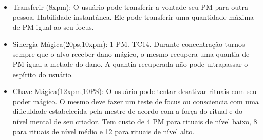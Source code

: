 \begin{itemize}
\item Transferir (8xpm): O usuário pode transferir a vontade seu PM para outra pessoa. Habilidade instantânea. Ele pode transferir uma quantidade máxima de PM igual ao seu focus.

	\item Sinergia Mágica(20ps,10xpm): 1 PM. TC14. \newline
Durante concentração turnos sempre que o alvo receber dano mágico, o mesmo recupera uma quantia de PM igual a metade do dano. A quantia recuperada não pode ultrapassar o espírito do usuário.

	\item  Chave Mágica(12xpm,10PS): O usuário pode tentar desativar rituais com seu poder mágico. O mesmo deve fazer um teste de focus ou consciencia com uma dificuldade estabelecida pela mestre de acordo com a força do ritual e do nível mental de seu criador. Tem custo de 4 PM para rituais de nível baixo, 8 para rituais de nível médio e 12 para rituais de nível alto.



\end{itemize}

